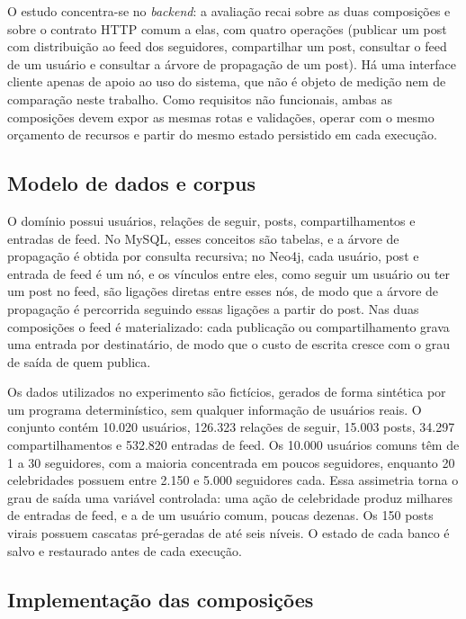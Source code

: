 O estudo concentra-se no \textit{backend}: a avaliação recai sobre as duas composições e sobre o contrato HTTP comum a elas, com quatro operações (publicar um post com distribuição ao feed dos seguidores, compartilhar um post, consultar o feed de um usuário e consultar a árvore de propagação de um post). Há uma interface cliente apenas de apoio ao uso do sistema, que não é objeto de medição nem de comparação neste trabalho. Como requisitos não funcionais, ambas as composições devem expor as mesmas rotas e validações, operar com o mesmo orçamento de recursos e partir do mesmo estado persistido em cada execução.

\estrutura\subsection{\esp Modelo de dados e corpus}

O domínio possui usuários, relações de seguir, posts, compartilhamentos e entradas de feed. No MySQL, esses conceitos são tabelas, e a árvore de propagação é obtida por consulta recursiva; no Neo4j, cada usuário, post e entrada de feed é um nó, e os vínculos entre eles, como seguir um usuário ou ter um post no feed, são ligações diretas entre esses nós, de modo que a árvore de propagação é percorrida seguindo essas ligações a partir do post. Nas duas composições o feed é materializado: cada publicação ou compartilhamento grava uma entrada por destinatário, de modo que o custo de escrita cresce com o grau de saída de quem publica.

Os dados utilizados no experimento são fictícios, gerados de forma sintética por um programa determinístico, sem qualquer informação de usuários reais. O conjunto contém 10.020 usuários, 126.323 relações de seguir, 15.003 posts, 34.297 compartilhamentos e 532.820 entradas de feed. Os 10.000 usuários comuns têm de 1 a 30 seguidores, com a maioria concentrada em poucos seguidores, enquanto 20 celebridades possuem entre 2.150 e 5.000 seguidores cada. Essa assimetria torna o grau de saída uma variável controlada: uma ação de celebridade produz milhares de entradas de feed, e a de um usuário comum, poucas dezenas. Os 150 posts virais possuem cascatas pré-geradas de até seis níveis. O estado de cada banco é salvo e restaurado antes de cada execução.

\estrutura\subsection{\esp Implementação das composições}


